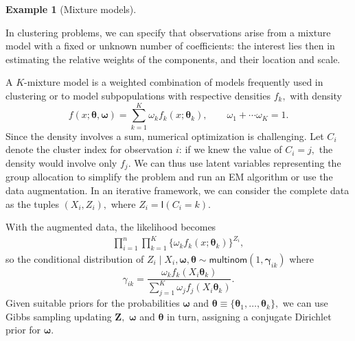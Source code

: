 \documentclass[
  11pt,
  letterpaper,
]{scrbook}
\theoremstyle{definition}
\theoremstyle{definition}
\newtheorem{example}{Example}[chapter]
\theoremstyle{definition}
\theoremstyle{plain}
\theoremstyle{plain}
\theoremstyle{plain}
\theoremstyle{remark}
\begin{document}
\begin{example}[Mixture
models]\protect\hypertarget{exm-mixture}{}\label{exm-mixture}

In clustering problems, we can specify that observations arise from a
mixture model with a fixed or unknown number of coefficients: the
interest lies then in estimating the relative weights of the components,
and their location and scale.

A \(K\)-mixture model is a weighted combination of models frequently
used in clustering or to model subpopulations with respective densities
\(f_k,\) with density
\[f(x; \boldsymbol{\theta}, \boldsymbol{\omega}) = \sum_{k=1}^K \omega_kf_k(x; \boldsymbol{\theta}_k), \qquad \omega_1 + \cdots \omega_K=1.\]
Since the density involves a sum, numerical optimization is challenging.
Let \(C_i\) denote the cluster index for observation \(i\): if we knew
the value of \(C_i =j,\) the density would involve only \(f_j.\) We can
thus use latent variables representing the group allocation to simplify
the problem and run an EM algorithm or use the data augmentation. In an
iterative framework, we can consider the complete data as the tuples
\((X_i, Z_i),\) where \(Z_i = \mathsf{I}(C_i=k).\)

With the augmented data, the likelihood becomes \begin{align*}
\prod_{i=1}^n \prod_{k=1}^K \{\omega_kf_k(x; \boldsymbol{\theta}_k)\}^{Z_i},
\end{align*} so the conditional distribution of
\(Z_i \mid X_i, \boldsymbol{\omega}, \boldsymbol{\theta} \sim \mathsf{multinom}(1, \boldsymbol{\gamma}_{ik})\)
where
\[\gamma_{ik} = \frac{\omega_k f_k(X_i\boldsymbol{\theta}_k)}{\sum_{j=1}^K \omega_jf_j(X_i\boldsymbol{\theta}_k)}.\]
Given suitable priors for the probabilities \(\boldsymbol{\omega}\) and
\(\boldsymbol{\theta} \equiv \{\boldsymbol{\theta}_1, \ldots, \boldsymbol{\theta}_k\},\)
we can use Gibbs sampling updating \(\boldsymbol{Z},\)
\(\boldsymbol{\omega}\) and \(\boldsymbol{\theta}\) in turn, assigning a
conjugate Dirichlet prior for \(\boldsymbol{\omega}.\)

\end{example}
\end{document}
